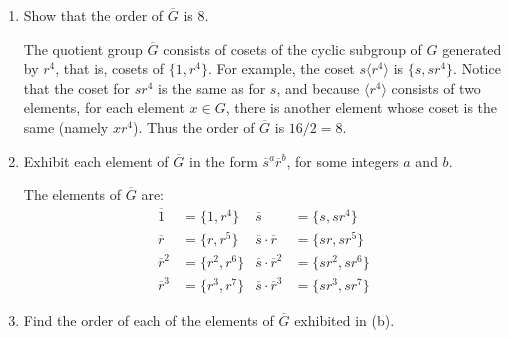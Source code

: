 \documentclass{article}
\begin{document}
\begin{enumerate}[label=(\alph*), itemsep=0em]
    \item Show that the order of $\overline{G}$ is 8.
          
          The quotient group $\overline{G}$ consists of cosets of the cyclic subgroup of $G$ generated by $r^4$, that is, cosets of $\{ 1, r^4 \}$. For example, the coset $s \langle r^4 \rangle$ is $\{ s, sr^4 \}$. Notice that the coset for $sr^4$ is the same as for $s$, and because $\langle r^4 \rangle$ consists of two elements, for each element $x \in G$, there is another element whose coset is the same (namely $xr^4$). Thus the order of $\overline{G}$ is $16/2 = 8$.
    \item Exhibit each element of $\overline{G}$ in the form $\overline{s}^a \overline{r}^b$, for some integers $a$ and $b$.

          The elements of $\overline{G}$ are: 
          \begin{align*}
            \overline{1} &= \{ 1, r^4 \} & \overline{s} &= \{ s, sr^4 \} \\ 
            \overline{r} &= \{ r, r^5 \} & \overline{s}\cdot\overline{r} &= \{ sr, sr^5 \} \\
            \overline{r}^2 &= \{ r^2, r^6 \} & \overline{s}\cdot\overline{r}^2 &= \{ sr^2, sr^6 \} \\
            \overline{r}^3 &= \{ r^3, r^7 \} & \overline{s}\cdot\overline{r}^3 &= \{ sr^3, sr^7 \}
          \end{align*}
    \item Find the order of each of the elements of $\overline{G}$ exhibited in (b).


\end{enumerate}
\end{document}
